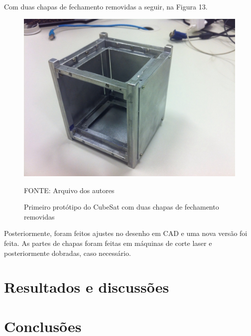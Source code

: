 \documentclass[
	12pt,				%
	openany,			%
	twoside,			%
	a4paper,			%
	english,			%
	french,				%
	spanish,			%
	brazil,				%
	oldfontcommands
	]{abntex2}
\begin{document}
Com duas chapas de fechamento removidas a seguir, na Figura 13.

\begin{figure}[th]
	\caption{Primeiro protótipo do CubeSat com duas chapas de fechamento removidas}
	\centering
	\includegraphics[width=0.7\linewidth]{./figs/PrototypeOne}
	
	\begin{small}
		FONTE: Arquivo dos autores
	\end{small}
	\label{fig:Protoone}
\end{figure}

Posteriormente, foram feitos ajustes no desenho em CAD e uma nova versão foi feita. As partes de chapas foram feitas em máquinas de corte laser e posteriormente dobradas, caso necessário.

\chapter[Resultados e discussões]{Resultados e discussões}

\chapter[Conclusões]{Conclusões}


\end{document}
